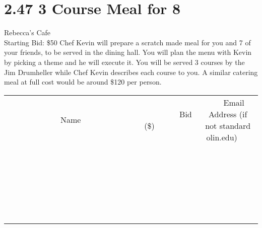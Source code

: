 \documentclass[11pt]{article}
\begin{document}
\section*{2.47 3 Course Meal for 8}
Rebecca's Cafe
\\
Starting Bid: \$50
\newline
Chef Kevin will prepare a scratch made meal for you and 7 of your friends, to be served in the dining hall. You will plan the menu with Kevin by picking a theme and he will execute it. You will be served 3 courses by the Jim Drumheller while Chef Kevin describes each course to you. A similar catering meal at full cost would be around \$120 per person.
\\[6ex]
\begin{tabular}{c c c}
~~~~~~~~~~~~~Name~~~~~~~~~~~~~ & ~~~~~~~~~Bid (\$)~~~~~~~~~  & ~~~Email Address (if not standard olin.edu)~~~\\
 & & \\
\hline
 & & \\
\hline
 & & \\
\hline
 & & \\
\hline
 & & \\
\hline
 & & \\
\hline
 & & \\
\hline
 & & \\
\hline
 & & \\
\hline
 & & \\
\hline
 & & \\
\hline
 & & \\
\hline
 & & \\
\hline
 & & \\
\hline
 & & \\
\hline
 & & \\
\hline
 & & \\
\hline
 & & \\
\hline
 & & \\
\hline
 & & \\
\hline
 & & \\
\hline
 & & \\
\hline
 & & \\
\hline
 & & \\
\hline
 & & \\
\hline
 & & \\
\hline
\end{tabular}
\newpage
\end{document}
